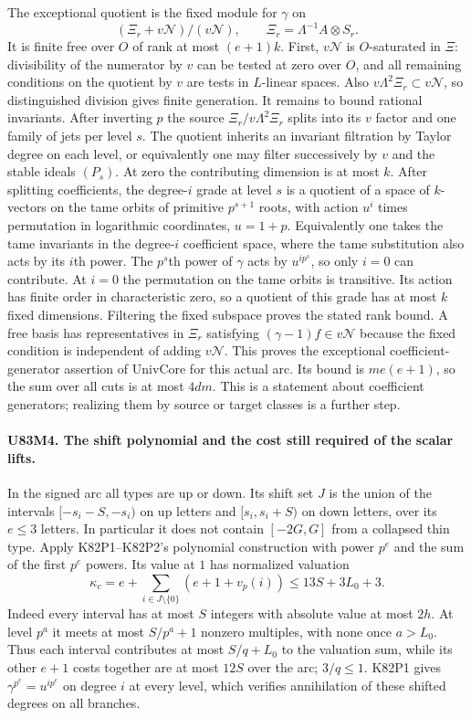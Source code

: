 The exceptional quotient is the fixed module for $\gamma$ on
\[
      (\Xi_r+v\mathcal N)/(v\mathcal N),\qquad
                   \Xi_r=\Lambda^{-1}A\otimes S_r.
\]
It is finite free over $O$ of rank at most $(e+1)k$. First,
$v\mathcal N$ is $O$-saturated in $\Xi$: divisibility of the
numerator by $v$ can be tested at zero over $O$, and all remaining
conditions on the quotient by $v$ are tests in $L$-linear spaces.
Also $v\Lambda^2\Xi_r\subset v\mathcal N$, so distinguished
division gives finite generation. It remains to bound rational
invariants. After inverting $p$ the source $\Xi_r/v\Lambda^2\Xi_r$
splits into its $v$ factor and one family of jets per level $s$.
The quotient inherits an invariant filtration by Taylor degree on
each level, or equivalently one may filter successively by $v$
and the stable ideals $(P_s)$. At zero the contributing dimension
is at most $k$. After splitting coefficients, the degree-$i$ grade
at level $s$ is a quotient of a space of $k$-vectors on the tame
orbits of primitive $p^{s+1}$ roots, with action $u^i$ times
permutation in logarithmic coordinates, $u=1+p$. Equivalently
one takes the tame invariants in the degree-$i$ coefficient space,
where the tame substitution also acts by its $i$th power.
The $p^s$th power of $\gamma$ acts by $u^{i p^s}$, so only
$i=0$ can contribute. At $i=0$ the permutation on the tame orbits
is transitive. Its action has finite order in characteristic zero,
so a quotient of this grade has at most $k$ fixed dimensions.
Filtering the fixed subspace proves the stated rank bound.
A free basis has representatives in $\Xi_r$ satisfying
$(\gamma-1)f\in v\mathcal N$ because the fixed condition is
independent of adding $v\mathcal N$. This proves the exceptional
coefficient-generator assertion of $\mathrm{UnivCore}$ for this
actual arc. Its bound is $me(e+1)$, so the sum over all cuts is
at most $4dm$. This is a statement about coefficient generators;
realizing them by source or target classes is a further step.

\paragraph{U83M4. The shift polynomial and the cost still required of the scalar lifts.}
In the signed arc all types are up or down. Its shift set $J$ is
the union of the intervals $[-s_i-S,-s_i)$ on up letters and
$[s_i,s_i+S)$ on down letters, over its $e\le3$ letters.
In particular it does not contain $[-2G,G]$ from a collapsed thin
type. Apply K82P1--K82P2's polynomial construction with power
$p^e$ and the sum of the first $p^e$ powers. Its value at $1$
has normalized valuation
\[
 \kappa_c=e+\sum_{i\in J\setminus\{0\}}(e+1+v_p(i))
          \le 13S+3L_0+3 .
\]
Indeed every interval has at most $S$ integers with absolute value
at most $2h$. At level $p^a$ it meets at most $S/p^a+1$ nonzero
multiples, with none once $a>L_0$. Thus each interval contributes
at most $S/q+L_0$ to the valuation sum, while its other $e+1$
costs together are at most $12S$ over the arc; $3/q\le1$.
K82P1 gives $\gamma^{p^e}=u^{ip^e}$ on degree $i$ at every level,
which verifies annihilation of these shifted degrees on all branches.


